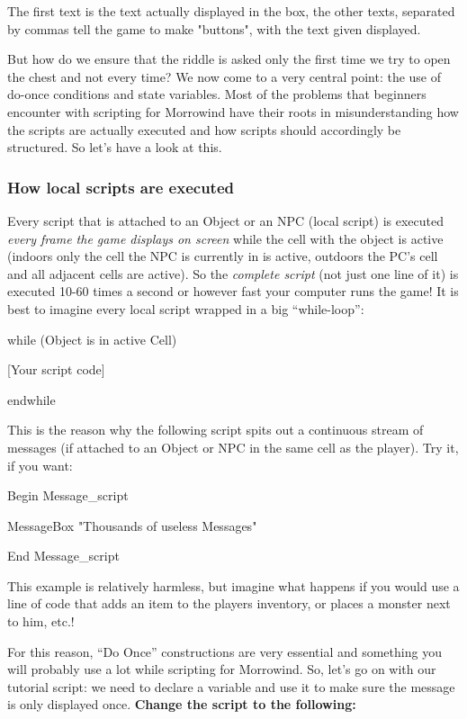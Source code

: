 \documentclass[
]{article}
\begin{document}
The first text is the text actually displayed in the box, the other
texts, separated by commas tell the game to make "buttons", with the
text given displayed.

But how do we ensure that the riddle is asked only the first time we try
to open the chest and not every time? We now come to a very central
point: the use of do-once conditions and state variables. Most of the
problems that beginners encounter with scripting for Morrowind have
their roots in misunderstanding how the scripts are actually executed
and how scripts should accordingly be structured. So let's have a look
at this.

\hypertarget{how-local-scripts-are-executed}{%
\subsubsection{How local scripts are
executed}\label{how-local-scripts-are-executed}}

Every script that is attached to an Object or an NPC (local script) is
executed \emph{every frame the game displays on screen} while the cell
with the object is active (indoors only the cell the NPC is currently in
is active, outdoors the PC's cell and all adjacent cells are active). So
the \emph{complete script} (not just one line of it) is executed 10-60
times a second or however fast your computer runs the game! It is best
to imagine every local script wrapped in a big ``while-loop'':

while (Object is in active Cell)

{[}Your script code{]}

endwhile

This is the reason why the following script spits out a continuous
stream of messages (if attached to an Object or NPC in the same cell as
the player). Try it, if you want:

Begin Message\_script

MessageBox "Thousands of useless Messages"

End Message\_script

This example is relatively harmless, but imagine what happens if you
would use a line of code that adds an item to the players inventory, or
places a monster next to him, etc.!

For this reason, ``Do Once'' constructions are very essential and
something you will probably use a lot while scripting for Morrowind. So,
let's go on with our tutorial script: we need to declare a variable and
use it to make sure the message is only displayed once. \textbf{Change
the script to the following:}
\end{document}
